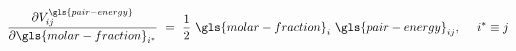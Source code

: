 \documentclass{article}
\begin{document}
\begin{equation}
    \frac{\partial V^{\gls{pair-energy}}_{ij}}{\partial \gls{molar-fraction}_{i^*}}\ =\ \frac{1}{2}\ \gls{molar-fraction}_i\ \gls{pair-energy}_{ij},\ \quad i^{*} \equiv j
\end{equation}

\begin{comment}
The directional derivative $\text{D}_{\gls{distance-vec}} \square$ of \cref{eq:pairing-term} is:
\begin{equation}
\label{eq:Dr-pairing-term}
    \text{D}_{\gls{distance-vec}}V^{\gls{pair-energy}}\ =\ \frac{1}{2} \sum_{i \in I_{Mg} \cup I_{H}} \sum_{\substack{j \\ j \neq i}} \gls{molar-fraction}_i \gls{molar-fraction}_j\ \frac{d \gls{pair-energy}_{ij}}{d \| \gls{distance-vec}_{ij} \|} \frac{d \| \gls{distance-vec}_{ij} \| }{d \gls{distance-vec}_{ij}}\ =\ \frac{1}{2} \sum_{\substack{i , j \\ j \neq i}} \gls{molar-fraction}_i \gls{molar-fraction}_j\ \frac{d \gls{pair-energy}_{ij}}{d \| \gls{distance-vec}_{ij} \|} \gls{normalized-distance-vec}_{ij}\ 
\end{equation}

Gathering terms in \cref{eq:Dr-pairing-term} for the two different species in the system:
\begin{equation}
\label{eq:Dr-pairing-term-species}
\begin{split}
\text{D}_{\gls{distance-vec}}V^{\gls{pair-energy}}\ =\ \frac{1}{2} \sum_{\substack{i , j \in I_{Mg} \\ j \neq i}} \frac{d \gls{pair-energy}_{ij}}{d \| \gls{distance-vec}_{ij} \|} \gls{normalized-distance-vec}_{ij}\ +\ \sum_{\substack{i \in I_{H}, j \in I_{Mg}\ \\ j \neq i}} \gls{molar-fraction}_i\ \frac{d \gls{pair-energy}_{ij}}{d \| \gls{distance-vec}_{ij} \|} \gls{normalized-distance-vec}_{ij}\ +\ \frac{1}{2} \sum_{\substack{i, j \in I_{H}\ \\ j \neq i}} \gls{molar-fraction}_i \gls{molar-fraction}_j\ \frac{d \gls{pair-energy}_{ij}}{d \| \gls{distance-vec}_{ij} \|} \gls{normalized-distance-vec}_{ij}       
\end{split} 
\end{equation}


\end{comment}
\end{document}
